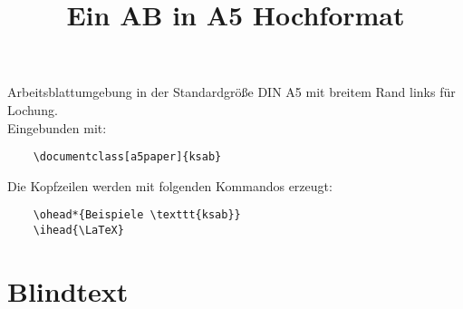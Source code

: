 \documentclass[a5paper]{ksab}
\title{Ein AB in A5 Hochformat}
\begin{document}
  \maketitle
  
  Arbeitsblattumgebung in der Standardgröße DIN A5 mit breitem Rand links für Lochung.\\
  Eingebunden mit:
  \begin{verbatim}
    \documentclass[a5paper]{ksab}
  \end{verbatim}
  
  Die Kopfzeilen werden mit folgenden Kommandos erzeugt:
  \begin{verbatim}
    \ohead*{Beispiele \texttt{ksab}}
    \ihead{\LaTeX}
  \end{verbatim}
  
  \section{Blindtext}
  \blindtext
\end{document}
